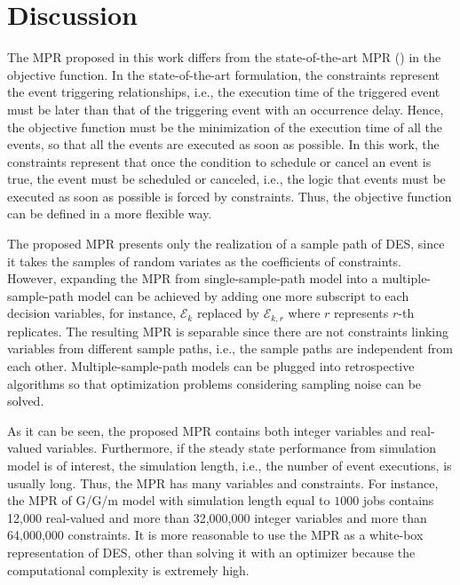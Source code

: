 \documentclass[suppldata]{interact}
\theoremstyle{plain}
\theoremstyle{definition}
\theoremstyle{remark}
\begin{document}
\section{Discussion}\label{sec:discussion}

The MPR proposed in this work differs from the state-of-the-art MPR (\cite{chan2008optimization}) in the objective function. In the state-of-the-art formulation, the constraints represent the event triggering relationships, i.e., the execution time of the triggered event must be later than that of the triggering event with an occurrence delay. Hence, the objective function must be the minimization of the execution time of all the events, so that all the events are executed as soon as possible. In this work, the constraints represent that once the condition to schedule or cancel an event is true, the event must be scheduled or canceled, i.e., the logic that events must be executed as soon as possible is forced by constraints. Thus, the objective function can be defined in a more flexible way. 

The proposed MPR presents only the realization of a sample path of DES, since it takes the samples of random variates as the coefficients of constraints. However, expanding the MPR from single-sample-path model into a multiple-sample-path model can be achieved by adding one more subscript to each decision variables, for instance, $\mathcal{E}_k$ replaced by $\mathcal{E}_{k,r}$ where $r$ represents $r$-th replicates. The resulting MPR is separable since there are not constraints linking variables from different sample paths, i.e., the sample paths are independent from each other. Multiple-sample-path models can be plugged into retrospective algorithms so that optimization problems considering sampling noise can be solved.

As it can be seen, the proposed MPR contains both integer variables and real-valued variables. Furthermore, if the steady state performance from simulation model is of interest, the simulation length, i.e., the number of event executions, is usually long. Thus, the MPR has many variables and constraints. For instance, the MPR of G/G/m model with simulation length equal to $1000$ jobs contains 12,000 real-valued and more than 32,000,000 integer variables and more than 64,000,000 constraints. It is more reasonable to use the MPR as a white-box representation of DES, other than solving it with an optimizer because the computational complexity is extremely high. 
\end{document}
